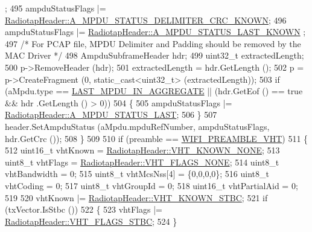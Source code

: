 \begin{DoxyCode}
      ;
495             ampduStatusFlags |= 
      \hyperlink{classns3_1_1RadiotapHeader_a9f8333ba19c8dc9ae63e7e03af87a557abb6bed35bef11dd95a696d65994cf7db}{RadiotapHeader::A\_MPDU\_STATUS\_DELIMITER\_CRC\_KNOWN};
496             ampduStatusFlags |= \hyperlink{classns3_1_1RadiotapHeader_a9f8333ba19c8dc9ae63e7e03af87a557ad9c553bb630ebec01fc4cfe8ff68ec9a}{RadiotapHeader::A\_MPDU\_STATUS\_LAST\_KNOWN}
      ;
497             \textcolor{comment}{/* For PCAP file, MPDU Delimiter and Padding should be removed by the MAC Driver */}
498             AmpduSubframeHeader hdr;
499             uint32\_t extractedLength;
500             p->RemoveHeader (hdr);
501             extractedLength = hdr.GetLength ();
502             p = p->CreateFragment (0, static\_cast<uint32\_t> (extractedLength));
503             \textcolor{keywordflow}{if} (aMpdu.type == \hyperlink{namespacens3_ae617d41bbd0c07fa58ee2306f687b055a00f5645550d1d4766ba10c4ac229b276}{LAST\_MPDU\_IN\_AGGREGATE} || (hdr.GetEof () == \textcolor{keyword}{true} && hdr
      .GetLength () > 0))
504               \{
505                 ampduStatusFlags |= \hyperlink{classns3_1_1RadiotapHeader_a9f8333ba19c8dc9ae63e7e03af87a557ae15e8d17497685bcc4428548af011f1b}{RadiotapHeader::A\_MPDU\_STATUS\_LAST};
506               \}
507             header.SetAmpduStatus (aMpdu.mpduRefNumber, ampduStatusFlags, hdr.GetCrc ());
508           \}
509 
510         \textcolor{keywordflow}{if} (preamble == \hyperlink{group__wifi_gga5e94a56cb338a14ffbbb19c6a41251ebab90b0fe0b17f27e51c0fe16239e7b089}{WIFI\_PREAMBLE\_VHT})
511           \{
512             uint16\_t vhtKnown = \hyperlink{classns3_1_1RadiotapHeader_a3479bfa57eb27bd6e5eeb2556ab8f5a8a3fab8c5b84a45f60637048bcf0558753}{RadiotapHeader::VHT\_KNOWN\_NONE};
513             uint8\_t vhtFlags = \hyperlink{classns3_1_1RadiotapHeader_a6df30f9a6b9d20263a6e5531377eed5ca68c88b11b4361e729731affcda369704}{RadiotapHeader::VHT\_FLAGS\_NONE};
514             uint8\_t vhtBandwidth = 0;
515             uint8\_t vhtMcsNss[4] = \{0,0,0,0\};
516             uint8\_t vhtCoding = 0;
517             uint8\_t vhtGroupId = 0;
518             uint16\_t vhtPartialAid = 0;
519 
520             vhtKnown |= \hyperlink{classns3_1_1RadiotapHeader_a3479bfa57eb27bd6e5eeb2556ab8f5a8a7d8adf3b395ad622e2ef6824ce609db7}{RadiotapHeader::VHT\_KNOWN\_STBC};
521             \textcolor{keywordflow}{if} (txVector.IsStbc ())
522               \{
523                 vhtFlags |= \hyperlink{classns3_1_1RadiotapHeader_a6df30f9a6b9d20263a6e5531377eed5cadb77d4e25015f2144524a297927dad83}{RadiotapHeader::VHT\_FLAGS\_STBC};
524               \}

\end{DoxyCode}
